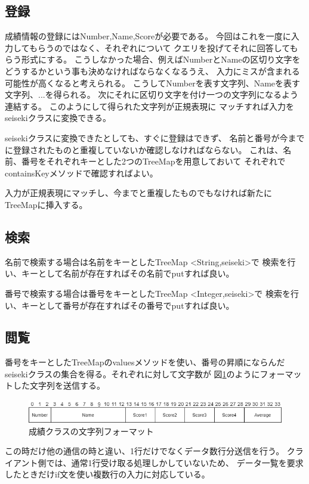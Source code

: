 \documentclass[dvipdfmx]{jsarticle}
\begin{document}
\subsection{登録}
成績情報の登録にはNumber,Name,Scoreが必要である。
今回はこれを一度に入力してもらうのではなく、それぞれについて
クエリを投げてそれに回答してもらう形式にする。
こうしなかった場合、例えばNumberとNameの区切り文字を
どうするかという事も決めなければならなくなるうえ、
入力にミスが含まれる可能性が高くなると考えられる。
こうしてNumberを表す文字列、Nameを表す文字列、...を得られる。
次にそれに区切り文字を付け一つの文字列になるよう連結する。
このようにして得られた文字列が正規表現に
マッチすれば入力をseisekiクラスに変換できる。

seisekiクラスに変換できたとしても、すぐに登録はできず、
名前と番号が今までに登録されたものと重複していないか確認しなければならない。
これは、名前、番号をそれぞれキーとした2つのTreeMapを用意しておいて
それぞれでcontainsKeyメソッドで確認すればよい。

入力が正規表現にマッチし、今までと重複したものでもなければ新たに
TreeMapに挿入する。

\subsection{検索}
名前で検索する場合は名前をキーとしたTreeMap \textless String,seiseki\textgreater で
検索を行い、キーとして名前が存在すればその名前でputすれば良い。

番号で検索する場合は番号をキーとしたTreeMap \textless Integer,seiseki\textgreater で
検索を行い、キーとして番号が存在すればその番号でputすれば良い。

\subsection{閲覧}
番号をキーとしたTreeMapのvaluesメソッドを使い、番号の昇順にならんだ
seisekiクラスの集合を得る。それぞれに対して文字数が
図\ref{seiseki_format}のようにフォーマットした文字列を送信する。
\begin{figure}[H]
  \centering
  \includegraphics[width=0.9\hsize]{../pic/seiseki_format.png}
  \caption{成績クラスの文字列フォーマット}
  \label{seiseki_format}
\end{figure}

この時だけ他の通信の時と違い、1行だけでなくデータ数行分送信を行う。
クライアント側では、通常1行受け取る処理しかしていないため、
データ一覧を要求したときだけif文を使い複数行の入力に対応している。
\end{document}
